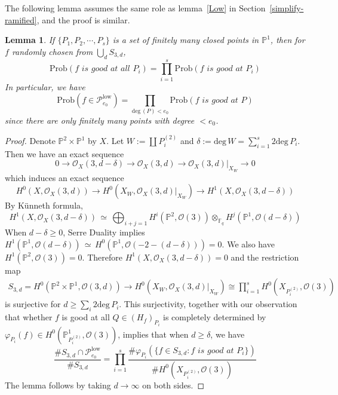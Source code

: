 \documentclass[12pt]{article}
\theoremstyle{plain}
\newtheorem{lemma}[equation]{Lemma}
\theoremstyle{definition}
\newcommand{\IF}{\mathbb{F}}
\newcommand{\IP}{\mathbb{P}}
\newcommand{\sO}{\mathcal{O}}
\newcommand{\sP}{\mathcal{P}}
\renewcommand{\deg}{\mathrm{deg}\,}
\newcommand\iso{{\, \simeq \,}}
\newcommand\tensor{{\otimes}}
\newcommand\union{\bigcup}
\newcommand{\<}{\langle}
\renewcommand{\>}{\rangle}
\newcommand{\Prob}{\mathrm{Prob}}
\begin{document}
The following lemma assumes the same role as lemma~\ref{Low} in Section~\ref{simplify-ramified}, and the proof is similar. 
\begin{lemma}
\label{pointsurj}
If $\{P_1, P_2, \cdots, P_s\}$ is a set of finitely many closed points in $\IP^1$, then for $f$ randomly chosen from $\union_d S_{3, d}$,
$$ \Prob(f \textit{ is good at all } P_i) = \prod_{i = 1}^s \Prob( f \textit{ is good at } P_i) $$
In particular, we have
$$\Prob(f \in \sP_{e_0}^{\mathrm{low}})  = \prod_{\deg(P) < e_0}  \Prob( f \textit{ is good at } P ) $$
since there are only finitely many points with degree $< e_0$. 
\end{lemma}
\begin{proof} 
Denote $\IP^2 \times \IP^1$ by $X$. Let $W := \coprod P_i^{(2)}$ and $\delta := \deg W = \sum_{i = 1}^s 2 \deg P_i$. Then we have an exact sequence 
$$ 0 \to \sO_X(3, d - \delta) \to \sO_X(3, d) \to \sO_X(3, d)|_{X_W} \to 0  $$
which induces an exact sequence 
$$ H^0(X, \sO_X(3, d)) \to H^0(X_W, \sO_X(3, d)|_{X_W}) \to H^1(X, \sO_X(3, d - \delta)) $$
By K{\"u}nneth formula, 
$$ H^1(X, \sO_X(3, d - \delta)) \iso \bigoplus_{i + j = 1} H^i(\IP^2, \sO(3))\tensor_{\IF_q} H^j(\IP^1, \sO(d - \delta))   $$
When $d - \delta \ge 0$, Serre Duality implies $ H^1(\IP^1, \sO(d - \delta)) \iso H^0(\IP^1, \sO(-2-(d - \delta)))= 0$. We also have $H^1(\IP^2, \sO(3)) = 0$.
Therefore $H^1(X, \sO_X(3, d - \delta)) = 0$ and the restriction map
\begin{align*}
S_{3, d} = H^0(\IP^2 \times \IP^1, \sO(3, d)) \to H^0(X_W, \sO_X(3, d)|_{X_W}) \cong \prod_{i = 1}^s H^0(X_{P_i^{(2)}}, \sO(3))
\end{align*}
is surjective for $ d \ge \sum_i 2 \deg P_i$. This surjectivity, together with our observation that whether $f$ is good at all $Q \in (H_f)_{P_i}$ is completely determined by $\varphi_{P_i}(f) \in H^0(\IP^1_{P_i^{(2)}}, \sO(3))$, implies that when $d \ge \delta$, we have 
$$ \frac{\# S_{3, d} \cap \sP_{e_0}^{\mathrm{low}}}{\# S_{3, d}} = \prod_{i = 1}^s \frac{\# \varphi_{P_i}(\{ f \in S_{3, d} : f \textit{ is good at }P_i\})}{\# H^0(X_{P^{(2)}_i}, \sO(3))} $$
The lemma follows by taking $d \to \infty$ on both sides. 
\end{proof}
\end{document}
